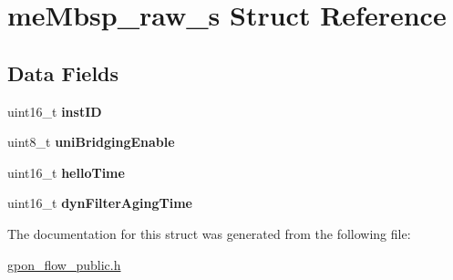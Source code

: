 \hypertarget{structmeMbsp__raw__s}{}\section{me\+Mbsp\+\_\+raw\+\_\+s Struct Reference}
\label{structmeMbsp__raw__s}
\subsection*{Data Fields}
\begin{DoxyCompactItemize}
\item 
\mbox{\label{structmeMbsp__raw__s_a78c2ea875645fcc5bfb3fa2b731696f0}} 
uint16\+\_\+t {\bfseries inst\+ID}
\item 
\mbox{\label{structmeMbsp__raw__s_ab61185ce19e11cf4d42ef0f902ef5bda}} 
uint8\+\_\+t {\bfseries uni\+Bridging\+Enable}
\item 
\mbox{\label{structmeMbsp__raw__s_a02c309b9af42d8b8af3f3229f1161e47}} 
uint16\+\_\+t {\bfseries hello\+Time}
\item 
\mbox{\label{structmeMbsp__raw__s_acdedb867fe1a7dd898f239fa54d7e588}} 
uint16\+\_\+t {\bfseries dyn\+Filter\+Aging\+Time}
\end{DoxyCompactItemize}


The documentation for this struct was generated from the following file\+:\begin{DoxyCompactItemize}
\item 
\hyperlink{gpon__flow__public_8h}{gpon\+\_\+flow\+\_\+public.\+h}\end{DoxyCompactItemize}

